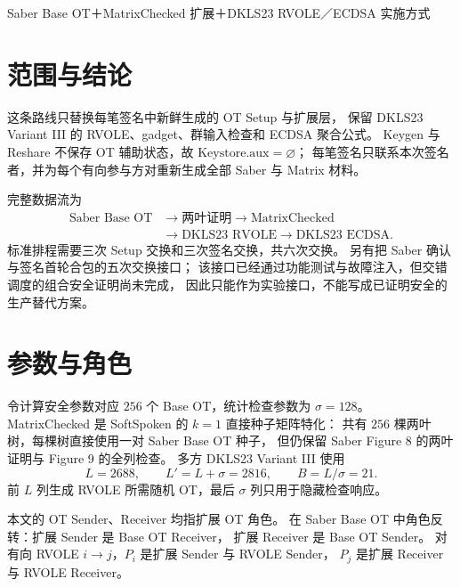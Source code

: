 
\renewcommand{\doctitle}{Saber Base OT＋MatrixChecked 扩展＋DKLS23 RVOLE／ECDSA 实施方式}

\begin{center}
  {\LARGE\heitiLatin\heiti\mdseries\doctitle\par}
\end{center}
\vspace{1em}

\section{范围与结论}

这条路线只替换每笔签名中新鲜生成的 OT Setup 与扩展层，
保留 DKLS23 Variant III 的 RVOLE、gadget、群输入检查和 ECDSA 聚合公式。
Keygen 与 Reshare 不保存 OT 辅助状态，故 $\mathrm{Keystore.aux}=\varnothing$；
每笔签名只联系本次签名者，并为每个有向参与方对重新生成全部 Saber 与 Matrix 材料。

完整数据流为
\[
  \begin{aligned}
    \text{Saber Base OT}&\longrightarrow \text{两叶证明}
      \longrightarrow \text{MatrixChecked}\\
      &\longrightarrow \text{DKLS23 RVOLE}
      \longrightarrow \text{DKLS23 ECDSA}.
  \end{aligned}
\]
标准排程需要三次 Setup 交换和三次签名交换，共六次交换。
另有把 Saber 确认与签名首轮合包的五次交换接口；
该接口已经通过功能测试与故障注入，但交错调度的组合安全证明尚未完成，
因此只能作为实验接口，不能写成已证明安全的生产替代方案。

\section{参数与角色}

令计算安全参数对应 $256$ 个 Base OT，统计检查参数为 $\sigma=128$。
MatrixChecked 是 SoftSpoken 的 $k=1$ 直接种子矩阵特化：
共有 $256$ 棵两叶树，每棵树直接使用一对 Saber Base OT 种子，
但仍保留 Saber Figure 8 的两叶证明与 Figure 9 的全列检查。
多方 DKLS23 Variant III 使用
\[
  L=2688,\qquad L'=L+\sigma=2816,\qquad B=L/\sigma=21.
\]
前 $L$ 列生成 RVOLE 所需随机 OT，最后 $\sigma$ 列只用于隐藏检查响应。

本文的 OT Sender、Receiver 均指扩展 OT 角色。
在 Saber Base OT 中角色反转：扩展 Sender 是 Base OT Receiver，
扩展 Receiver 是 Base OT Sender。
对有向 RVOLE $i\to j$，$P_i$ 是扩展 Sender 与 RVOLE Sender，
$P_j$ 是扩展 Receiver 与 RVOLE Receiver。

